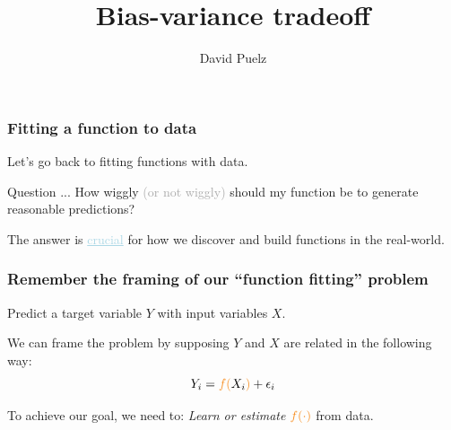\documentclass{beamer}
\title[]{\Large{Bias-variance tradeoff} \vspace{5mm}}
\author{David Puelz \\ \dg{\small The University of Austin}}
\institute[] %
{

}
\date{} %
\newcommand{\bo}[1]{\textcolor{burntorange}{#1}}
\newcommand{\lb}[1]{\textcolor{lightblue}{#1}}
\newcommand{\dg}[1]{\textcolor{darkgray}{#1}}
\newcommand{\sk}{\vspace{.5cm}}
\newcommand{\skoo}{\vspace{.2in}}
\newcommand{\skooo}{\vspace{.3in}}
\begin{document}
{
\begin{frame}[noframenumbering]
\vspace{12mm}
\vspace{5mm}
\titlepage %
\end{frame}
}







\begin{frame}[plain]
\frametitle{Fitting a function to data}


Let's go back to fitting functions with data. \\  \sk\sk

Question ... \bo{How wiggly \dg{(or not wiggly)} should my function be to generate reasonable predictions?} \\ \sk\sk

The answer is \lb{\underline{crucial}} for how we discover and build functions in the real-world.

 

\end{frame}




\begin{frame}[plain]
\frametitle{Remember the framing of our ``function fitting'' problem}
Predict a \bo{target variable $Y$} with \bo{input variables $X$}.\skooo 


\pause
\skoo

We can frame the problem by supposing $Y$ and $X$ are related in the following way:
$$
Y_i = \bo{f(}X_i\bo{)} + \epsilon_i
$$

\skoo
{To achieve our goal, we need to: {\it Learn or estimate} $\bo{f(\cdot)}$ from data. }


\end{frame}
\end{document}
